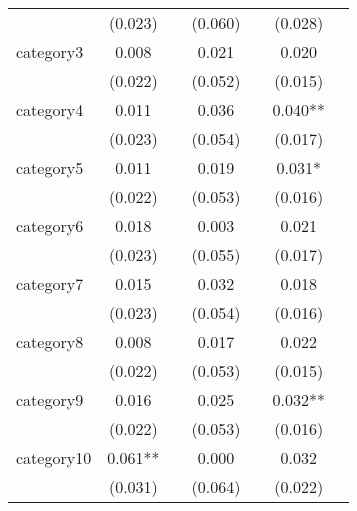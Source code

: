 {\begin{tabular}{l*{6}{c}}
            &     (0.023)   &               &     (0.060)   &               &     (0.028)   &               \\
[1em]
category3   &       0.008   &               &       0.021   &               &       0.020   &               \\
            &     (0.022)   &               &     (0.052)   &               &     (0.015)   &               \\
[1em]
category4   &       0.011   &               &       0.036   &               &       0.040** &               \\
            &     (0.023)   &               &     (0.054)   &               &     (0.017)   &               \\
[1em]
category5   &       0.011   &               &       0.019   &               &       0.031*  &               \\
            &     (0.022)   &               &     (0.053)   &               &     (0.016)   &               \\
[1em]
category6   &       0.018   &               &       0.003   &               &       0.021   &               \\
            &     (0.023)   &               &     (0.055)   &               &     (0.017)   &               \\
[1em]
category7   &       0.015   &               &       0.032   &               &       0.018   &               \\
            &     (0.023)   &               &     (0.054)   &               &     (0.016)   &               \\
[1em]
category8   &       0.008   &               &       0.017   &               &       0.022   &               \\
            &     (0.022)   &               &     (0.053)   &               &     (0.015)   &               \\
[1em]
category9   &       0.016   &               &       0.025   &               &       0.032** &               \\
            &     (0.022)   &               &     (0.053)   &               &     (0.016)   &               \\
[1em]
category10  &       0.061** &               &       0.000   &               &       0.032   &               \\
            &     (0.031)   &               &     (0.064)   &               &     (0.022)   &               \\

\end{tabular}}
